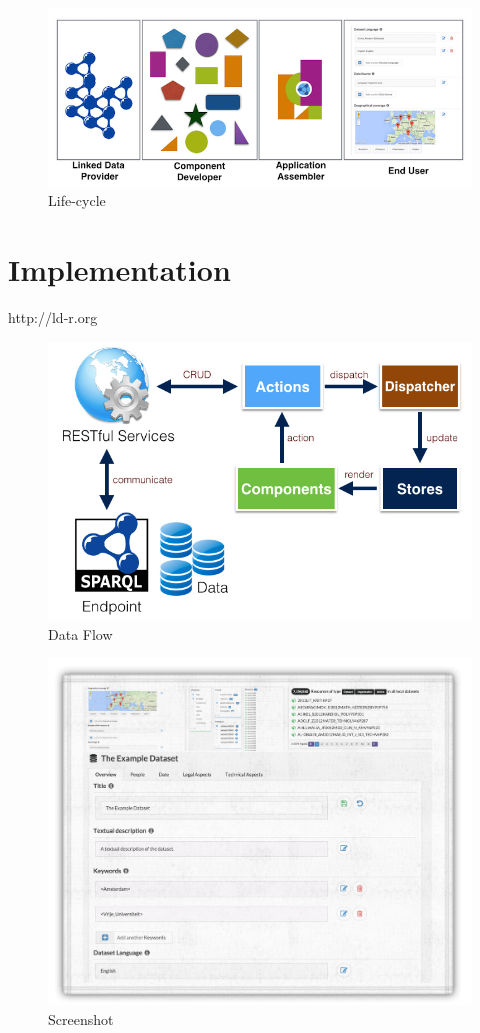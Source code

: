 \documentclass{acm_proc_article-sp}
\begin{document}
\begin{figure}[tb]
  \includegraphics[width=1\linewidth]{images/lifecycle.jpg}
  \caption{Life-cycle}
\end{figure}

\section{Implementation}

http://ld-r.org


\begin{figure}[tb]
  \includegraphics[width=.9\linewidth]{images/dataflow.jpg}
  \caption{Data Flow}
\end{figure}

\begin{figure}[tb]
  \includegraphics[width=.9\linewidth]{images/screenshot.png}
  \caption{Screenshot}
\end{figure}
\end{document}
